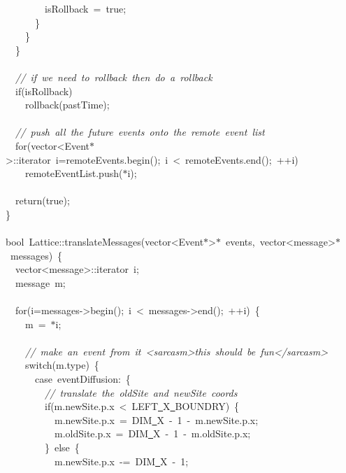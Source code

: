 {\ \ \ \ \ \ \ \ isRollback\ =\ true;\\
\ \ \ \ \ \ \}\\
\ \ \ \ \}\\
\ \ \}\\
\ \\
\ \ \textsl{//\ if\ we\ need\ to\ rollback\ then\ do\ a\ rollback}\\
\ \ if(isRollback)\\
\ \ \ \ rollback(pastTime);\\
\ \\
\ \ \textsl{//\ push\ all\ the\ future\ events\ onto\ the\ remote\ event\ list}\\
\ \ for(vector<{}Event$\ast$>{}::iterator\ i=remoteEvents.begin();\ i\ <{}\ remoteEvents.end();\ ++i)\\
\ \ \ \ remoteEventList.push($\ast$i);\\
\ \\
\ \ return(true);\\
\}\\
\ \\
bool\ Lattice::translateMessages(vector<{}Event$\ast$>{}$\ast$\ events,\ vector<{}message>{}$\ast$\ messages)\ \{\\
\ \ vector<{}message>{}::iterator\ i;\\
\ \ message\ m;\\
\ \\
\ \ for(i=messages-{}>{}begin();\ i\ <{}\ messages-{}>{}end();\ ++i)\ \{\\
\ \ \ \ m\ =\ $\ast$i;\\
\ \\
\ \ \ \ \textsl{//\ make\ an\ event\ from\ it\ <{}sarcasm>{}this\ should\ be\ fun<{}/sarcasm>{}}\\
\ \ \ \ switch(m.type)\ \{\\
\ \ \ \ \ \ case\ eventDiffusion:\ \{\\
\ \ \ \ \ \ \ \ \textsl{//\ translate\ the\ oldSite\ and\ newSite\ coords}\\
\ \ \ \ \ \ \ \ if(m.newSite.p.x\ <{}\ LEFT\underline\ X\underline\ BOUNDRY)\ \{\\
\ \ \ \ \ \ \ \ \ \ m.newSite.p.x\ =\ DIM\underline\ X\ -{}\ 1\ -{}\ m.newSite.p.x;\\
\ \ \ \ \ \ \ \ \ \ m.oldSite.p.x\ =\ DIM\underline\ X\ -{}\ 1\ -{}\ m.oldSite.p.x;\\
\ \ \ \ \ \ \ \ \}\ else\ \{\\
\ \ \ \ \ \ \ \ \ \ m.newSite.p.x\ -{}=\ DIM\underline\ X\ -{}\ 1;\\
}
